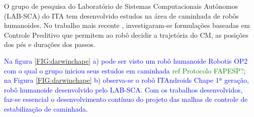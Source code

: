 
O grupo de pesquisa do Laboratório de Sistemas Computacionais Autônomos (LAB-SCA) do ITA tem desenvolvido estudos na área de caminhada de robôs humanoides\cite{max22,max25,max27,max28,tesemarcos}.
No trabalho mais recente \cite{tesemarcos}, investigaram-se formulações baseadas em  Controle Preditivo  que permitem ao robô decidir a 
trajetória do CM, as posições dos pés e durações dos passos.

\textcolor{blue}{Na figura \ref{FIG:darwinchape} a) pode ser visto um robô humanoide Robotis OP2 com o qual o grupo iniciou seus estudos em caminhada} \textcolor{green}{ref Protocolo FAPESP?}; \textcolor{blue}{na Figura \ref{FIG:darwinchape} b) observa-se o robô ITAndroids Chape 1ª geração, robô humanoide desenvolvido pelo LAB-SCA. Com os trabalhos desenvolvidos, faz-se essencial o desenvolvimento contínuo do projeto das malhas de controle de estabilização de caminhada.}

